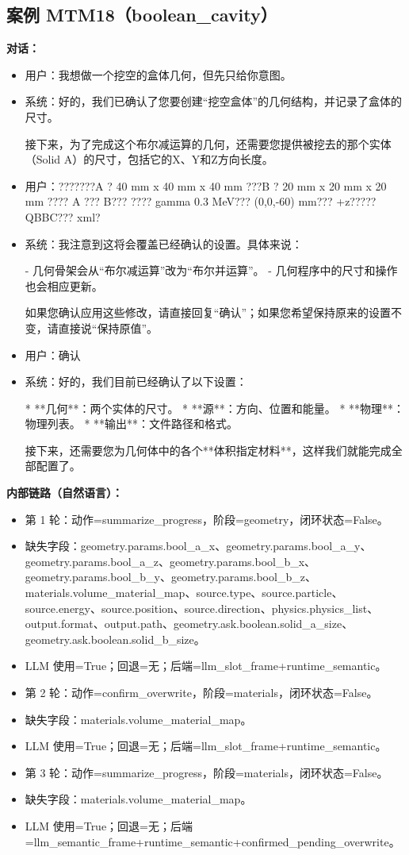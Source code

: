 \documentclass[11pt]{ctexart}
\begin{document}
\subsection{案例 MTM18（boolean\_cavity）}
\textbf{对话：}
\begin{itemize}
\item 用户：我想做一个挖空的盒体几何，但先只给你意图。
\item 系统：好的，我们已确认了您要创建“挖空盒体”的几何结构，并记录了盒体的尺寸。

接下来，为了完成这个布尔减运算的几何，还需要您提供被挖去的那个实体（Solid A）的尺寸，包括它的X、Y和Z方向长度。
\item 用户：???????A ? 40 mm x 40 mm x 40 mm ???B ? 20 mm x 20 mm x 20 mm ???? A ??? B??? ???? gamma 0.3 MeV??? (0,0,-60) mm??? +z????? QBBC??? xml?
\item 系统：我注意到这将会覆盖已经确认的设置。具体来说：

- 几何骨架会从“布尔减运算”改为“布尔并运算”。
- 几何程序中的尺寸和操作也会相应更新。

如果您确认应用这些修改，请直接回复“确认”；如果您希望保持原来的设置不变，请直接说“保持原值”。
\item 用户：确认
\item 系统：好的，我们目前已经确认了以下设置：

*   **几何**：两个实体的尺寸。
*   **源**：方向、位置和能量。
*   **物理**：物理列表。
*   **输出**：文件路径和格式。

接下来，还需要您为几何体中的各个**体积指定材料**，这样我们就能完成全部配置了。
\end{itemize}
\textbf{内部链路（自然语言）：}
\begin{itemize}
\item 第 1 轮：动作=summarize\_progress，阶段=geometry，闭环状态=False。
\item 缺失字段：geometry.params.bool\_a\_x、geometry.params.bool\_a\_y、geometry.params.bool\_a\_z、geometry.params.bool\_b\_x、geometry.params.bool\_b\_y、geometry.params.bool\_b\_z、materials.volume\_material\_map、source.type、source.particle、source.energy、source.position、source.direction、physics.physics\_list、output.format、output.path、geometry.ask.boolean.solid\_a\_size、geometry.ask.boolean.solid\_b\_size。
\item LLM 使用=True；回退=无；后端=llm\_slot\_frame+runtime\_semantic。
\item 第 2 轮：动作=confirm\_overwrite，阶段=materials，闭环状态=False。
\item 缺失字段：materials.volume\_material\_map。
\item LLM 使用=True；回退=无；后端=llm\_slot\_frame+runtime\_semantic。
\item 第 3 轮：动作=summarize\_progress，阶段=materials，闭环状态=False。
\item 缺失字段：materials.volume\_material\_map。
\item LLM 使用=True；回退=无；后端=llm\_semantic\_frame+runtime\_semantic+confirmed\_pending\_overwrite。
\end{itemize}
\end{document}
